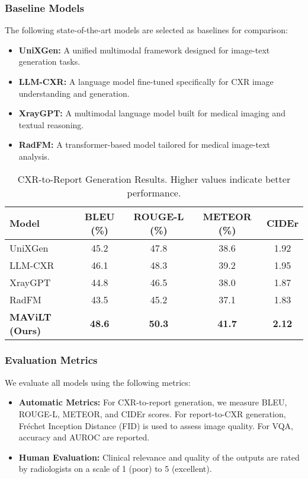 \subsubsection{Baseline Models}
The following state-of-the-art models are selected as baselines for comparison:
\begin{itemize}
    \item \textbf{UniXGen:} A unified multimodal framework designed for image-text generation tasks.
    \item \textbf{LLM-CXR:} A language model fine-tuned specifically for CXR image understanding and generation.
    \item \textbf{XrayGPT:} A multimodal language model built for medical imaging and textual reasoning.
    \item \textbf{RadFM:} A transformer-based model tailored for medical image-text analysis.
\end{itemize}

\begin{table*}[!t]
    \centering
    \caption{CXR-to-Report Generation Results. Higher values indicate better performance.}
    \label{tab:cxr-to-report}
    \begin{tabular}{lcccc}
        \toprule
        \textbf{Model} & \textbf{BLEU (\%)} & \textbf{ROUGE-L (\%)} & \textbf{METEOR (\%)} & \textbf{CIDEr} \\
        \midrule
        UniXGen       & 45.2 & 47.8 & 38.6 & 1.92 \\
        LLM-CXR       & 46.1 & 48.3 & 39.2 & 1.95 \\
        XrayGPT       & 44.8 & 46.5 & 38.0 & 1.87 \\
        RadFM         & 43.5 & 45.2 & 37.1 & 1.83 \\
        \textbf{MAViLT (Ours)} & \textbf{48.6} & \textbf{50.3} & \textbf{41.7} & \textbf{2.12} \\
        \bottomrule
    \end{tabular}
\end{table*}

\subsubsection{Evaluation Metrics}
We evaluate all models using the following metrics:
\begin{itemize}
    \item \textbf{Automatic Metrics:} For CXR-to-report generation, we measure BLEU, ROUGE-L, METEOR, and CIDEr scores. For report-to-CXR generation, Fréchet Inception Distance (FID) is used to assess image quality. For VQA, accuracy and AUROC are reported.
    \item \textbf{Human Evaluation:} Clinical relevance and quality of the outputs are rated by radiologists on a scale of 1 (poor) to 5 (excellent).
\end{itemize}

